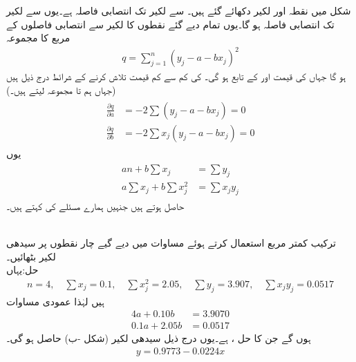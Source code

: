 شکل  میں نقطہ  اور لکیر  دکھائے گئے ہیں۔ سے لکیر تک انتصابی فاصلہ  ہے۔یوں  سے لکیر تک انتصابی فاصلہ  ہو گا۔یوں تمام دیے گئے نقطوں کا لکیر سے انتصابی فاصلوں کے مربع کا مجموعہ
\begin{align*}
q=\sum_{j=1}^{n} (y_j-a-bx_j)^2
\end{align*}
ہو گا جہاں  کی قیمت  اور  کے تابع ہو گی۔ کی کم سے کم قیمت تلاش کرنے کے شرائط درج ذیل ہیں (جہاں ہم  تا  مجموعہ لیتے ہیں۔)
\begin{gather}
\begin{aligned}\label{مساوات_خطی_اعدادی_کمتر_مربع_شرائط_ب}
\frac{\partial q}{\partial a}&=-2\sum(y_j-a-bx_j)=0\\[0.5ex]
\frac{\partial q}{\partial b}&=-2\sum x_j(y_j-a-bx_j)=0
\end{aligned} 
\end{gather}
یوں 
\begin{gather}
\begin{aligned}\label{مساوات_خطی_اعدادی_کمتر_مربع_شرائط_پ}
an+b\sum x_j&=\sum y_j\\[0.5ex]
a\sum x_j+b\sum x_j^2&=\sum x_jy_j
\end{aligned}
\end{gather}
حاصل ہوتے ہیں جنہیں ہمارے مسئلے کی  کہتے ہیں۔

\quad {}\\
ترکیب کمتر مربع استعمال کرتے ہوئے  مساوات  میں دیے گیے چار نقطوں پر  سیدھی لکیر بٹھائیں۔\\
حل:\quad یہاں
\begin{align*}
n=4,\quad \sum x_j=0.1,\quad \sum x_j^2=2.05,\quad \sum y_j=3.907, \quad \sum x_jy_j=0.0517
\end{align*}  
ہیں لہٰذا عمودی مساوات
\begin{align*}
4a+0.10b&=3.9070\\
0.1a+2.05b&=0.0517
\end{align*}
ہوں گے جن کا حل ،  ہے۔یوں درج ذیل سیدھی لکیر (شکل -ب) حاصل ہو گی۔
\begin{align*}
y=0.9773-0.0224x
\end{align*}

